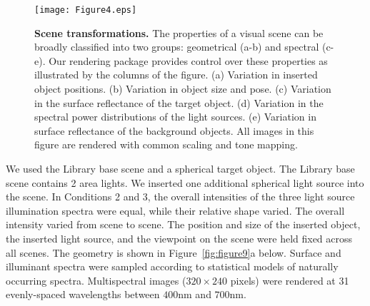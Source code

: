 \documentclass{jov}
\begin{document}
\begin{figure}
\texttt{[image: Figure4.eps]}
    \caption{{\bf Scene transformations.} The properties of a visual scene can be broadly classified into two groups: geometrical (a-b) and spectral (c-e). Our rendering package provides control over these properties as illustrated by the columns of the figure. (a) Variation in inserted object positions. (b) Variation in object size and pose. (c) Variation in the surface reflectance of the target object. (d) Variation in the spectral power distributions of the light sources. (e) Variation in surface reflectance of the background objects. All images in this figure are rendered with common scaling and tone mapping.
\label{fig:VWCCTransformations}}
\end{figure}

We used the Library base scene and a spherical target object.
The Library base scene contains 2 area lights. 
We inserted one additional spherical light source into the scene.
In Conditions 2 and 3, the overall intensities of the three light source illumination spectra were equal, while their relative shape varied. 
The overall intensity varied from scene to scene.
The position and size of the inserted object, the inserted light source, and the viewpoint on the scene were held fixed across all 
scenes. The geometry is shown in Figure~\ref{fig:figure9}a below.
Surface and illuminant spectra were sampled according to statistical models of naturally occurring spectra.
Multispectral images ($320 \times 240$ pixels) were rendered at 31 evenly-spaced wavelengths between $400$nm and $700$nm.
\end{document}
